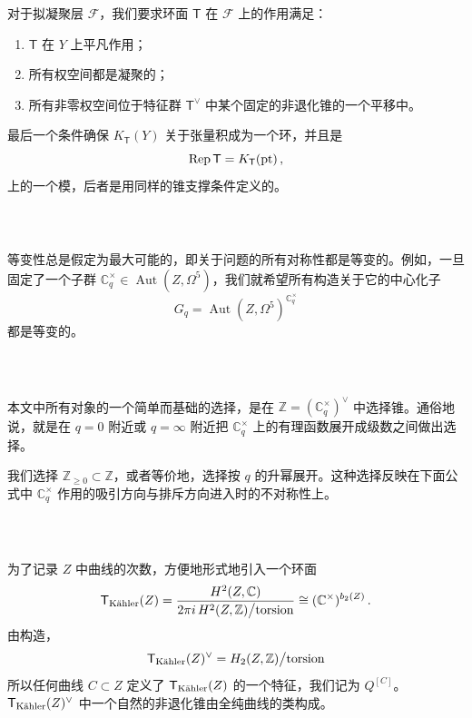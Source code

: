 \documentclass[12pt]{article}
\newcommand{\C}{\mathbb{C}}
\newcommand{\Z}{\mathbb{Z}}
\DeclareMathOperator{\Aut}{Aut}
\DeclareMathOperator{\Rep}{Rep}
\newcommand{\cF}{\mathscr{F}}
\newcommand{\Ct}{\mathbb{C}^{\times}}
\newcommand{\Cq}{\Ct_q}
\newcommand{\bT}{\mathsf{T}}
\newcommand{\TK}{\bT_{\textup{K\"ahler}}}
\newcommand{\pt}{\textup{pt}}
\theoremstyle{definition}
\begin{document}
对于拟凝聚层 $\cF$，我们要求环面 $\bT$ 在 $\cF$ 上的作用满足：
\begin{enumerate}
\item[(1)] $\bT$ 在 $Y$ 上平凡作用；
\item[(2)] 所有权空间都是凝聚的；
\item[(3)] 所有非零权空间位于特征群 $\bT^{\vee}$ 中某个固定的非退化锥的一个平移中。
\end{enumerate}
最后一个条件确保 $K_{\bT}(Y)$ 关于张量积成为一个环，并且是
$$
\Rep \bT = K_{\bT}(\pt)\,,
$$
上的一个模，后者是用同样的锥支撑条件定义的。

\subsubsection{\ }

等变性总是假定为最大可能的，即关于问题的所有对称性都是等变的。例如，一旦固定了一个子群 $\Cq\in \Aut(Z,\Omega^5)$，我们就希望所有构造关于它的中心化子
$$
G_q = \Aut(Z,\Omega^5)^{\Cq}
$$
都是等变的。

\subsubsection{\ }\label{coneCq}

本文中所有对象的一个简单而基础的选择，是在 $\Z = \left(\Cq\right)^{\vee}$ 中选择锥。通俗地说，就是在 $q=0$ 附近或 $q=\infty$ 附近把 $\Cq$ 上的有理函数展开成级数之间做出选择。

我们选择 $\Z_{\ge 0} \subset \Z$，或者等价地，选择按 $q$ 的升幂展开。这种选择反映在下面公式中 $\Cq$ 作用的吸引方向与排斥方向进入时的不对称性上。

\subsubsection{\ }

为了记录 $Z$ 中曲线的次数，方便地形式地引入一个环面
\begin{equation}
\TK(Z) = \frac{H^2(Z,\C)}{2\pi i \, H^2(Z,\Z) \big/ \textup{torsion}} \cong (\Ct)^{b_2(Z)} \,.
\label{defTK}
\end{equation}
由构造，
$$
\TK(Z)^{\vee} = H_2(Z,\Z) \big/ \textup{torsion}
$$
所以任何曲线 $C\subset Z$ 定义了 $\TK(Z)$ 的一个特征，我们记为 $Q^{[C]}$。$\TK(Z)^{\vee}$ 中一个自然的非退化锥由全纯曲线的类构成。

\subsubsection{\ }\label{s_K_push}
\end{document}
